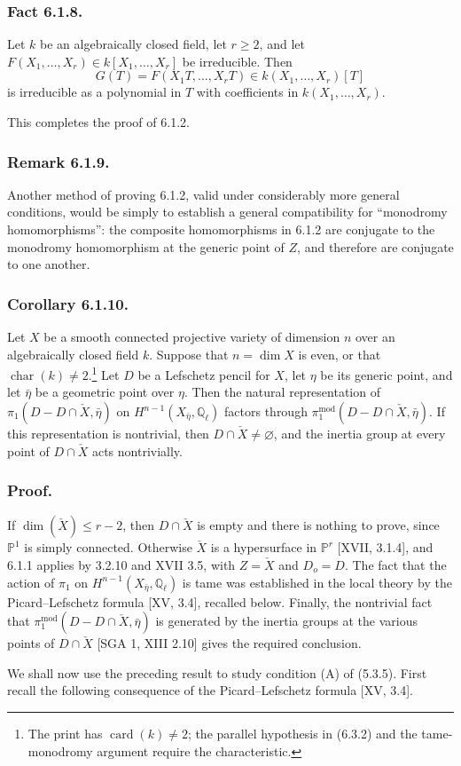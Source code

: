 \subsubsection*{Fact 6.1.8.}
Let $k$ be an algebraically closed field, let $r\ge2$, and let
$F(X_1,\ldots,X_r)\in k[X_1,\ldots,X_r]$ be irreducible.  Then
\[
G(T)=F(X_1T,\ldots,X_rT)\in k(X_1,\ldots,X_r)[T]
\]
is irreducible as a polynomial in $T$ with coefficients in
$k(X_1,\ldots,X_r)$.

This completes the proof of 6.1.2.

\subsubsection*{Remark 6.1.9.}
Another method of proving 6.1.2, valid under considerably more general
conditions, would be simply to establish a general compatibility for
``monodromy homomorphisms'': the composite homomorphisms in 6.1.2 are
conjugate to the monodromy homomorphism at the generic point of $Z$, and
therefore are conjugate to one another.

\subsubsection*{Corollary 6.1.10.}
Let $X$ be a smooth connected projective variety of dimension $n$ over an
algebraically closed field $k$.  Suppose that $n=\dim X$ is even, or that
$\operatorname{char}(k)\ne2$.\footnote{The print has
$\operatorname{card}(k)\ne2$; the parallel hypothesis in (6.3.2) and the
tame-monodromy argument require the characteristic.}
Let $D$ be a Lefschetz pencil for $X$, let $\eta$ be its generic point,
and let $\bar\eta$ be a geometric point over $\eta$.  Then the natural
representation of
$\pi_1(D-D\cap\check X,\bar\eta)$ on
$H^{n-1}(X_{\bar\eta},\mathbb Q_\ell)$ factors through
$\pi_1^{\mathrm{mod}}(D-D\cap\check X,\bar\eta)$.  If this
representation is nontrivial, then $D\cap\check X\ne\varnothing$, and
the inertia group at every point of $D\cap\check X$ acts nontrivially.

\subsubsection*{Proof.}
If $\dim(\check X)\le r-2$, then $D\cap\check X$ is empty and there is
nothing to prove, since $\mathbb P^1$ is simply connected.  Otherwise
$\check X$ is a hypersurface in $\mathbb P^r$ [XVII, 3.1.4], and 6.1.1
applies by 3.2.10 and XVII 3.5, with $Z=\check X$ and $D_o=D$.  The fact
that the action of $\pi_1$ on
$H^{n-1}(X_{\bar\eta},\mathbb Q_\ell)$ is tame was established in the
local theory by the Picard--Lefschetz formula [XV, 3.4], recalled below.
Finally, the nontrivial fact that
$\pi_1^{\mathrm{mod}}(D-D\cap\check X,\bar\eta)$ is generated by the
inertia groups at the various points of $D\cap\check X$ [SGA 1, XIII
2.10] gives the required conclusion.

We shall now use the preceding result to study condition (A) of (5.3.5).
First recall the following consequence of the Picard--Lefschetz formula
[XV, 3.4].
